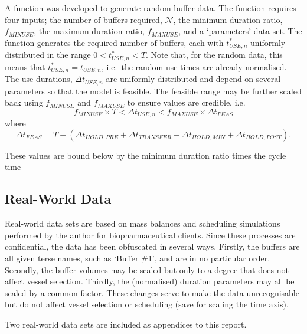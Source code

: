 A function was developed to generate random buffer data.
The function requires four inputs; the number of buffers required,
$\mathcal{N}$, the minimum duration ratio, $f_{\mathit{MINUSE}}$, the maximum
duration ratio, $f_{\mathit{MAXUSE}}$, and a `parameters' data set.
The function generates the required number of buffers, each with
$t_{\mathit{USE},n}^{*}$ uniformly distributed in the range
$0 < t_{\mathit{USE},n}^{*} < T$. Note that, for the random data, this means
that $t_{\mathit{USE},n}^{*} = t_{\mathit{USE},n}$, i.e.\ the random use
times are already normalised.
The use durations, $\Delta t_{\mathit{USE},n}$ are uniformly distributed and
depend on several parameters so that the model is feasible.  The feasible range
may be further scaled back using $f_{\mathit{MINUSE}}$ and
$f_{\mathit{MAXUSE}}$ to ensure values are credible, i.e.\
\begin{equation}
    f_{\mathit{MINUSE}} \times T < \Delta t_{\mathit{USE},n}
    < f_{\mathit{MAXUSE}} \times \Delta t_{\mathit{FEAS}}
\end{equation}
where
\begin{equation}
    \Delta t_{\mathit{FEAS}} = T - \left( 
    \Delta t_{\mathit{HOLD,PRE}}
    + \Delta t_{\mathit{TRANSFER}}
    + \Delta t_{\mathit{HOLD,MIN}}
    + \Delta t_{\mathit{HOLD,POST}} \right).
\end{equation}

These values are bound below by the minimum duration ratio times the cycle time

\subsection{Real-World Data}\label{SS.realdata}
Real-world data sets are based on mass balances and scheduling simulations
performed by the author for biopharmaceutical clients.
Since these processes are confidential, the data has been obfuscated in
several ways.
Firstly, the buffers are all given terse names, such as `Buffer \#1', and are
in no particular order.
Secondly, the buffer volumes may be scaled but only to a degree that does not
affect vessel selection.
Thirdly, the (normalised) duration parameters may all be scaled by a common
factor.
These changes serve to make the data unrecognisable but do not affect vessel
selection or scheduling (save for scaling the time axis).

Two real-world data sets are included as appendices to this report.



